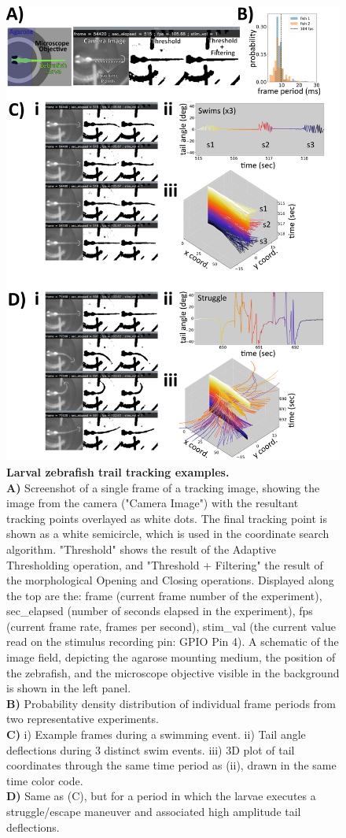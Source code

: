 \documentclass[9pt,lineno]{RandlettLab_elife}
\begin{document}
\begin{figure}
\begin{fullwidth}
\begin{center}

\includegraphics[width=0.65\linewidth]{Figure2_TrackingResults.png}
\caption{\textbf{Larval zebrafish trail tracking examples.}
\\ \textbf{A)} Screenshot of a single frame of a tracking image, showing the image from the camera ("Camera Image") with the resultant tracking points overlayed as white dots. The final tracking point is shown as a white semicircle, which is used in the coordinate search algorithm. "Threshold" shows the result of the Adaptive Thresholding operation, and "Threshold + Filtering" the result of the morphological Opening and Closing operations. Displayed along the top are the: frame (current frame number of the experiment), sec\_elapsed (number of seconds elapsed in the experiment), fps (current frame rate, frames per second), stim\_val (the current value read on the stimulus recording pin: GPIO Pin 4). A schematic of the image field, depicting the agarose mounting medium, the position of the zebrafish, and the microscope objective visible in the background is shown in the left panel.
\\ \textbf{B)} Probability density distribution of individual frame periods from two representative experiments. 
\\ \textbf{C)} i) Example frames during a swimming event. ii) Tail angle deflections during 3 distinct swim events. iii) 3D plot of tail coordinates through the same time period as (ii), drawn in the same time color code. 
\\ \textbf{D)} Same as (C), but for a period in which the larvae executes a struggle/escape maneuver and associated high amplitude tail deflections. 
}
\label{fig:2}


\end{center}
\end{fullwidth}
\end{figure}
\end{document}
